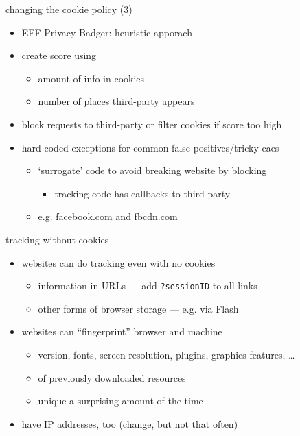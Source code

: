 \begin{frame}{changing the cookie policy (3)}
    \begin{itemize}
    \item EFF Privacy Badger: heuristic apporach
    \item create score using 
        \begin{itemize}
        \item amount of info in cookies
        \item number of places third-party appears
        \end{itemize}
    \item block requests to third-party or filter cookies if score too high
    \item hard-coded exceptions for common false positives/tricky caes
        \begin{itemize}
        \item `surrogate' code to avoid breaking website by blocking
            \begin{itemize}
            \item tracking code has callbacks to third-party
            \end{itemize}
        \item e.g. facebook.com and fbcdn.com
        \end{itemize}
    \end{itemize}
\end{frame}

\begin{frame}[fragile,label=noCookieTrack]{tracking without cookies}
    \begin{itemize}
    \item websites can do tracking even with no cookies
        \begin{itemize}
        \item information in URLs --- add \texttt{?sessionID} to all links
        \item other forms of browser storage --- e.g. via Flash
        \end{itemize}
    \item websites can ``fingerprint'' browser and machine
        \begin{itemize}
        \item version, fonts, screen resolution, plugins, graphics features, \ldots
        \item {} of previously downloaded resources
        \item unique a surprising amount of the time
        \end{itemize}
    \item have IP addresses, too (change, but not that often)
    \end{itemize}
\end{frame}

